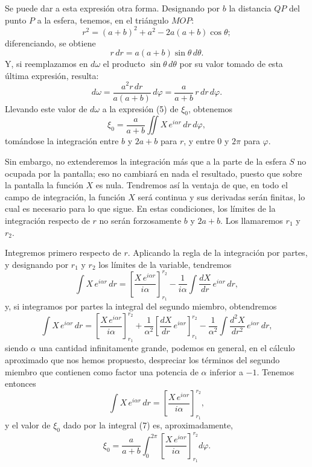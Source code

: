 Se puede dar a esta expresión otra forma. Designando por $b$ la distancia
$QP$ del punto $P$ a la esfera, tenemos, en el triángulo $MOP$:
\[
r^2=(a+b)^2+a^2-2a(a+b)\cos\theta;
\]
diferenciando, se obtiene
\[
r\,dr = a(a+b)\sin\theta\,d\theta.
\]
Y, si reemplazamos en $d\omega$ el producto $\sin\theta\,d\theta$ por su
valor tomado de esta última expresión, resulta:
\[
d\omega = \frac{a^2r\,dr}{a(a+b)}\,d\varphi = \frac{a}{a+b}\,r\,dr\,d\varphi.
\]
Llevando este valor de $d\omega$ a la expresión (5) de $\xi_0$, obtenemos
\begin{equation}
\xi_0 = \frac{a}{a+b}\iint X\,e^{i\alpha r}\,dr\,d\varphi,
\tag{7}
\end{equation}
tomándose la integración entre $b$ y $2a+b$ para $r$, y entre $0$ y $2\pi$
para $\varphi$.

Sin embargo, no extenderemos la integración más que a la parte de la
esfera $S$ no ocupada por la pantalla; eso no cambiará en nada el
resultado, puesto que sobre la pantalla la función $X$ es nula.
Tendremos así la ventaja de que, en todo el campo de integración, la
función $X$ será continua y sus derivadas serán finitas, lo cual es
necesario para lo que sigue. En estas condiciones, los límites de la
integración respecto de $r$ no serán forzosamente $b$ y $2a+b$. Los
llamaremos $r_1$ y $r_2$.

Integremos primero respecto de $r$. Aplicando la regla de la integración
por partes, y designando por $r_1$ y $r_2$ los límites de la variable,
tendremos
\[
\int X\,e^{i\alpha r}\,dr =
\left[\frac{X\,e^{i\alpha r}}{i\alpha}\right]_{r_1}^{r_2}
-\frac{1}{i\alpha}\int\frac{dX}{dr}\,e^{i\alpha r}\,dr,
\]
y, si integramos por partes la integral del segundo miembro, obtendremos
\[
\int X\,e^{i\alpha r}\,dr =
\left[\frac{X\,e^{i\alpha r}}{i\alpha}\right]_{r_1}^{r_2}
+\frac{1}{\alpha^2}\left[\frac{dX}{dr}\,e^{i\alpha r}\right]_{r_1}^{r_2}
-\frac{1}{\alpha^2}\int\frac{d^2X}{dr^2}\,e^{i\alpha r}\,dr,
\]
siendo $\alpha$ una cantidad infinitamente grande, podemos en general, en
el cálculo aproximado que nos hemos propuesto, despreciar los términos del
segundo miembro que contienen como factor una potencia de $\alpha$
inferior a $-1$. Tenemos entonces
\[
\int X\,e^{i\alpha r}\,dr =
\left[\frac{X\,e^{i\alpha r}}{i\alpha}\right]_{r_1}^{r_2},
\]
y el valor de $\xi_0$ dado por la integral (7) es, aproximadamente,
\begin{equation}
\xi_0 = \frac{a}{a+b}\int_0^{2\pi}
\left[\frac{X\,e^{i\alpha r}}{i\alpha}\right]_{r_1}^{r_2} d\varphi.
\tag{8}
\end{equation}


